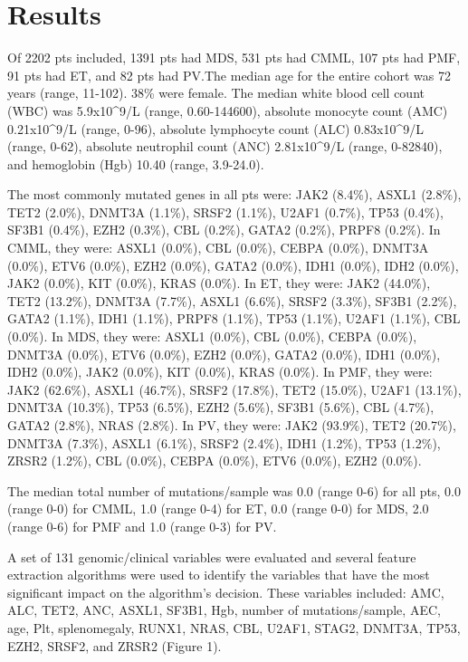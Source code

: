\section{Results}%
Of 2202 pts included, 1391 pts had MDS, 531 pts had CMML, 107 pts had PMF, 91 pts had ET, and 82 pts had PV.The median age for the entire cohort was 72 years (range, 11-102). 38\% were female. The median white blood cell count (WBC) was 5.9x10^9/L (range, 0.60-144600), absolute monocyte count (AMC) 0.21x10^9/L (range, 0-96), absolute lymphocyte count (ALC) 0.83x10^9/L (range, 0-62), absolute neutrophil count (ANC) 2.81x10^9/L (range, 0-82840), and hemoglobin (Hgb)  10.40 (range, 3.9-24.0). 

The most commonly mutated genes in all pts were: JAK2 (8.4\%), ASXL1 (2.8\%), TET2 (2.0\%), DNMT3A (1.1\%), SRSF2 (1.1\%), U2AF1 (0.7\%), TP53 (0.4\%), SF3B1 (0.4\%), EZH2 (0.3\%), CBL (0.2\%), GATA2 (0.2\%), PRPF8 (0.2\%). In CMML, they were: ASXL1 (0.0\%), CBL (0.0\%), CEBPA (0.0\%), DNMT3A (0.0\%), ETV6 (0.0\%), EZH2 (0.0\%), GATA2 (0.0\%), IDH1 (0.0\%), IDH2 (0.0\%), JAK2 (0.0\%), KIT (0.0\%), KRAS (0.0\%). In ET, they were: JAK2 (44.0\%), TET2 (13.2\%), DNMT3A (7.7\%), ASXL1 (6.6\%), SRSF2 (3.3\%), SF3B1 (2.2\%), GATA2 (1.1\%), IDH1 (1.1\%), PRPF8 (1.1\%), TP53 (1.1\%), U2AF1 (1.1\%), CBL (0.0\%). In MDS, they were: ASXL1 (0.0\%), CBL (0.0\%), CEBPA (0.0\%), DNMT3A (0.0\%), ETV6 (0.0\%), EZH2 (0.0\%), GATA2 (0.0\%), IDH1 (0.0\%), IDH2 (0.0\%), JAK2 (0.0\%), KIT (0.0\%), KRAS (0.0\%). In PMF, they were: JAK2 (62.6\%), ASXL1 (46.7\%), SRSF2 (17.8\%), TET2 (15.0\%), U2AF1 (13.1\%), DNMT3A (10.3\%), TP53 (6.5\%), EZH2 (5.6\%), SF3B1 (5.6\%), CBL (4.7\%), GATA2 (2.8\%), NRAS (2.8\%). In PV, they were: JAK2 (93.9\%), TET2 (20.7\%), DNMT3A (7.3\%), ASXL1 (6.1\%), SRSF2 (2.4\%), IDH1 (1.2\%), TP53 (1.2\%), ZRSR2 (1.2\%), CBL (0.0\%), CEBPA (0.0\%), ETV6 (0.0\%), EZH2 (0.0\%).

The median total number of mutations/sample was 0.0 (range 0-6) for all pts, 0.0 (range 0-0) for CMML, 1.0 (range 0-4) for ET, 0.0 (range 0-0) for MDS, 2.0 (range 0-6) for PMF and 1.0 (range 0-3) for PV.


A set of 131 genomic/clinical variables were evaluated and several feature extraction algorithms were used to identify the variables that have the most significant impact on the algorithm's decision. These variables included: AMC, ALC, TET2, ANC, ASXL1, SF3B1, Hgb, number of mutations/sample, AEC, age, Plt, splenomegaly, RUNX1, NRAS, CBL, U2AF1, STAG2, DNMT3A, TP53, EZH2, SRSF2, and ZRSR2 (Figure 1).

